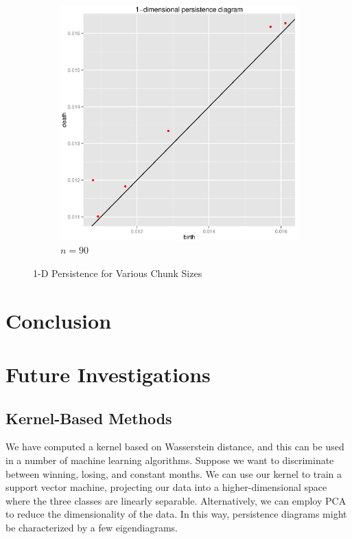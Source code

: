 \documentclass{article}
\begin{document}
\begin{figure}
\begin{subfigure}[htbp]{0.45 \textwidth}
\includegraphics[width = \linewidth]{psqplots/p2-1-90}
\caption{$n = 90$}
\label{p2-1-90}
\end{subfigure}

\caption{1-D Persistence for Various Chunk Sizes}
\end{figure}

\section{Conclusion}

\section{Future Investigations}
\subsection{Kernel-Based Methods}
We have computed a kernel based on Wasserstein distance, and this can be used in a number of machine learning algorithms. Suppose we want to discriminate between winning, losing, and constant months. We can use our kernel to train a support vector machine, projecting our data into a higher-dimensional space where the three classes are linearly separable. Alternatively, we can employ PCA to reduce the dimensionality of the data. In this way, persistence diagrams might be characterized by  a few eigendiagrams.
\end{document}
